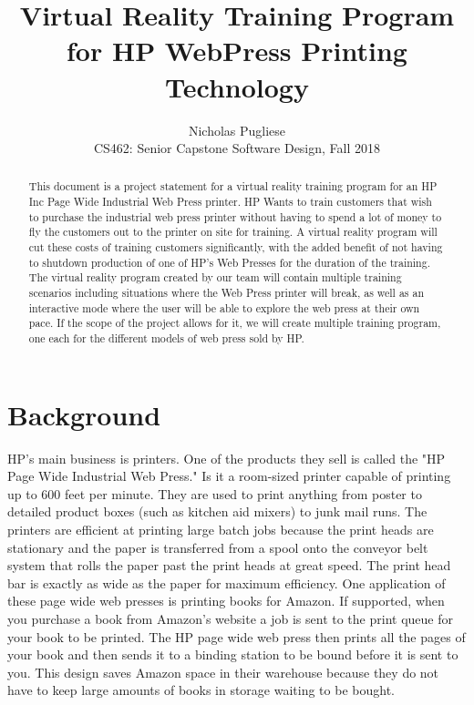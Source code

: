 \documentclass[draftclsnofoot,onecolumn]{IEEEtran}
\begin{document}
\title{Virtual Reality Training Program for HP WebPress Printing Technology}
\author{Nicholas Pugliese\\
CS462: Senior Capstone Software Design, Fall 2018\\
}
\maketitle


\begin{abstract}
This document is a project statement for a virtual reality training program for an HP Inc Page Wide Industrial Web Press printer. HP Wants to train customers that wish to purchase the industrial web press printer without having to spend a lot of money to fly the customers out to the printer on site for training. A virtual reality program will cut these costs of training customers significantly, with the added benefit of not having to shutdown production of one of HP's Web Presses for the duration of the training. The virtual reality program created by our team will contain multiple training scenarios including situations where the Web Press printer will break, as well as an interactive mode where the user will be able to explore the web press at their own pace. If the scope of the project allows for it, we will create multiple training program, one each for the different models of web press sold by HP.
\end{abstract}
\newpage
\section{Background}

HP's main business is printers. One of the products they sell is called the "HP Page Wide Industrial Web Press." Is it a room-sized printer capable of printing up to 600 feet per minute. They are used to print anything from poster to detailed product boxes (such as kitchen aid mixers) to junk mail runs. The printers are efficient at printing large batch jobs because the print heads are stationary and the paper is transferred from a spool onto the conveyor belt system that rolls the paper past the print heads at great speed. The print head bar is exactly as wide as the paper for maximum efficiency. One application of these page wide web presses is printing books for Amazon. If supported, when you purchase a book from Amazon's website a job is sent to the print queue for your book to be printed. The HP page wide web press then prints all the pages of your book and then sends it to a binding station to be bound before it is sent to you. This design saves Amazon space in their warehouse because they do not have to keep large amounts of books in storage waiting to be bought.
\end{document}

